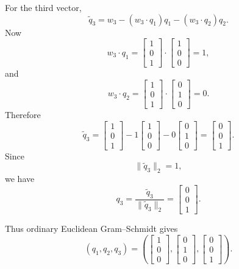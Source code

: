 \documentclass[12pt]{article}
\begin{document}
\begin{enumerate}[label=(\alph*)]
  For the third vector,
  \[
    \widetilde q_3
    =
    w_3-(w_3\cdot q_1)q_1-(w_3\cdot q_2)q_2.
  \]
  Now
  \[
    w_3\cdot q_1=
    \begin{bmatrix}1\\0\\1\end{bmatrix}
    \cdot
    \begin{bmatrix}1\\0\\0\end{bmatrix}
    =1,
  \]
  and
  \[
    w_3\cdot q_2=
    \begin{bmatrix}1\\0\\1\end{bmatrix}
    \cdot
    \begin{bmatrix}0\\1\\0\end{bmatrix}
    =0.
  \]
  Therefore
  \[
    \widetilde q_3
    =
    \begin{bmatrix}1\\0\\1\end{bmatrix}
    -
    1\begin{bmatrix}1\\0\\0\end{bmatrix}
    -
    0\begin{bmatrix}0\\1\\0\end{bmatrix}
    =
    \begin{bmatrix}0\\0\\1\end{bmatrix}.
  \]
  Since
  \[
    \|\widetilde q_3\|_2=1,
  \]
  we have
  \[
    q_3=\frac{\widetilde q_3}{\|\widetilde q_3\|_2}
    =
    \begin{bmatrix}0\\0\\1\end{bmatrix}.
  \]

  Thus ordinary Euclidean Gram--Schmidt gives
  \[
    (q_1,q_2,q_3)
    =
    \left(
    \begin{bmatrix}1\\0\\0\end{bmatrix},
    \begin{bmatrix}0\\1\\0\end{bmatrix},
    \begin{bmatrix}0\\0\\1\end{bmatrix}
    \right).
  \]


\end{enumerate}
\end{document}
